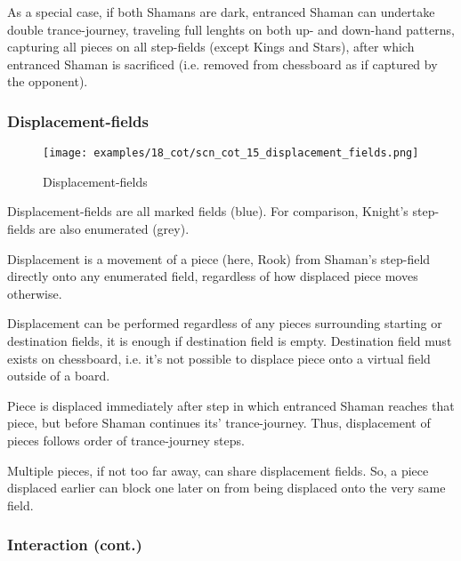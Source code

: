 As a special case, if both Shamans are dark, entranced Shaman can undertake double
trance-journey, traveling full lenghts on both up- and down-hand patterns, capturing
all pieces on all step-fields (except Kings and Stars), after which entranced Shaman
is sacrificed (i.e. removed from chessboard as if captured by the opponent).

\clearpage %

\subsubsection*{Displacement-fields}

\noindent
\begin{figure}[!h]
\texttt{[image: examples/18\_cot/scn\_cot\_15\_displacement\_fields.png]}
\caption{Displacement-fields}
\label{fig:scn_cot_15_displacement_fields}
\end{figure}

Displacement-fields are all marked fields (blue). For comparison, Knight's
step-fields are also enumerated (grey).

Displacement is a movement of a piece (here, Rook) from Shaman's step-field directly
onto any enumerated field, regardless of how displaced piece moves otherwise.

Displacement can be performed regardless of any pieces surrounding starting or
destination fields, it is enough if destination field is empty. Destination field
must exists on chessboard, i.e. it's not possible to displace piece onto a virtual
field outside of a board.

Piece is displaced immediately after step in which entranced Shaman reaches that piece,
but before Shaman continues its' trance-journey. Thus, displacement of pieces follows
order of trance-journey steps.

Multiple pieces, if not too far away, can share displacement fields. So, a piece
displaced earlier can block one later on from being displaced onto the very same
field.

\clearpage %

\subsubsection*{Interaction (cont.)}

